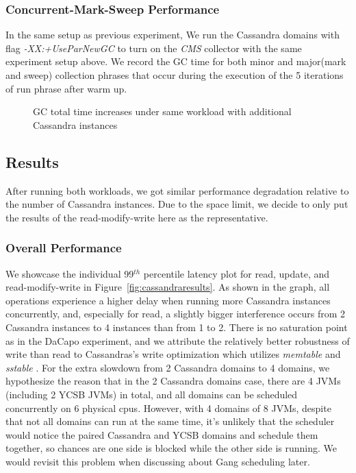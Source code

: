 \documentclass{sig-alternate}
\begin{document}
\subsubsection{Concurrent-Mark-Sweep Performance}
In the same setup as previous experiment, We run the Cassandra domains with flag \textit{-XX:+UseParNewGC} to turn on the \textit{CMS} collector with the same experiment setup above. We record the GC time for both minor and major(mark and sweep) collection phrases that occur during the execution of the 5 iterations of run phrase after warm up.

\begin{figure}
\centering
{}
\caption{GC total time increases under same workload with additional Cassandra instances}
\label{fig:cassandragc}
\end{figure}

\subsection{Results}
After running both workloads, we got similar performance degradation relative to the number of Cassandra instances. Due to the space limit, we decide to only put the results of the read-modify-write here as the representative.

\subsubsection{Overall Performance}
We showcase the individual 99$^{th}$ percentile latency plot for read, update, and read-modify-write in Figure~\ref{fig:cassandraresults}. As shown in the graph, all operations experience a higher delay when running more Cassandra instances concurrently, and, especially for read, a slightly bigger interference occurs from 2 Cassandra instances to 4 instances than from 1 to 2. There is no saturation point as in the DaCapo experiment, and we attribute the relatively better robustness of write than read to Cassandras's write optimization which utilizes \textit{memtable} and \textit{sstable} \cite{lakshman2010cassandra}. For the extra slowdown from 2 Cassandra domains to 4 domains, we hypothesize the reason that in the 2 Cassandra domains case, there are 4 JVMs (including 2 YCSB JVMs) in total, and all domains can be scheduled concurrently on 6 physical cpus. However, with 4 domains of 8 JVMs, despite that not all domains can run at the same time, it's unlikely that the scheduler would notice the paired Cassandra and YCSB domains and schedule them together, so chances are one side is blocked while the other side is running. We would revisit this problem when discussing about Gang scheduling later.
\end{document}
